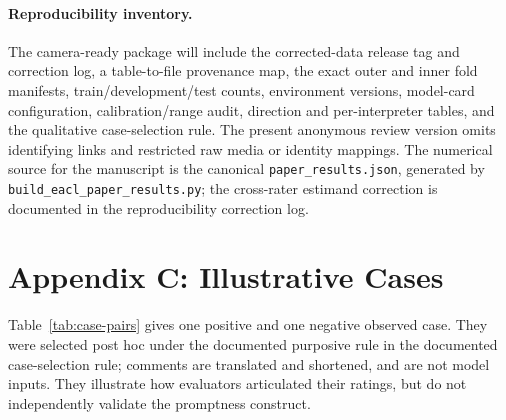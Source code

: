 \paragraph{Reproducibility inventory.} The camera-ready package will include the
corrected-data release tag and correction log, a table-to-file provenance map,
the exact outer and inner fold manifests, train/development/test counts,
environment versions, model-card configuration, calibration/range audit,
direction and per-interpreter tables, and the qualitative case-selection rule.
The present anonymous review version omits identifying links and restricted raw
media or identity mappings. The numerical source for the manuscript is the
canonical \texttt{paper\_results.json}, generated by
\texttt{build\_eacl\_paper\_results.py}; the cross-rater estimand correction is
documented in the reproducibility correction log.

\section*{Appendix C: Illustrative Cases}

Table~\ref{tab:case-pairs} gives one positive and one negative observed case.
They were selected post hoc under the documented purposive rule in the
documented case-selection rule; comments are translated and shortened, and are not
model inputs. They illustrate how evaluators articulated their ratings, but do not independently validate the promptness construct.

